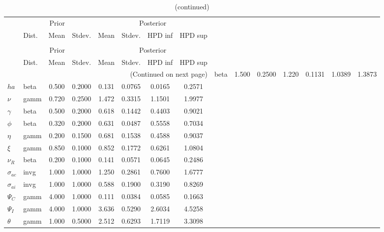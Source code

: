  
\begin{center}
\begin{longtable}{llcccccc} 
\caption{Results from Metropolis-Hastings (parameters)}
 \label{Table:MHPosterior:1}\\
\toprule 
  & \multicolumn{3}{c}{Prior}  &  \multicolumn{4}{c}{Posterior} \\
  \cmidrule(r{.75em}){2-4} \cmidrule(r{.75em}){5-8}
  & Dist. & Mean  & Stdev. & Mean & Stdev. & HPD inf & HPD sup\\
\midrule \endfirsthead 
\caption{(continued)}\\\toprule 
  & \multicolumn{3}{c}{Prior}  &  \multicolumn{4}{c}{Posterior} \\
  \cmidrule(r{.75em}){2-4} \cmidrule(r{.75em}){5-8}
  & Dist. & Mean  & Stdev. & Mean & Stdev. & HPD inf & HPD sup\\
\midrule \endhead 
\bottomrule \multicolumn{8}{r}{(Continued on next page)} \endfoot 
\bottomrule \endlastfoot 
${\sigma}$ & beta &   1.500 & 0.2500 &   1.220& 0.1131 &  1.0389 &  1.3873 \\ 
${ha}$ & beta &   0.500 & 0.2000 &   0.131& 0.0765 &  0.0165 &  0.2571 \\ 
$\nu$ & gamm &   0.720 & 0.2500 &   1.472& 0.3315 &  1.1501 &  1.9977 \\ 
$\gamma$ & beta &   0.500 & 0.2000 &   0.618& 0.1442 &  0.4403 &  0.9021 \\ 
${\phi}$ & beta &   0.320 & 0.2000 &   0.631& 0.0487 &  0.5558 &  0.7034 \\ 
${\eta}$ & gamm &   0.200 & 0.1500 &   0.681& 0.1538 &  0.4588 &  0.9037 \\ 
$\xi$ & gamm &   0.850 & 0.1000 &   0.852& 0.1772 &  0.6261 &  1.0804 \\ 
${\nu_R}$ & beta &   0.200 & 0.1000 &   0.141& 0.0571 &  0.0645 &  0.2486 \\ 
${\sigma_{ac}}$ & invg &   1.000 & 1.0000 &   1.250& 0.2861 &  0.7600 &  1.6777 \\ 
${\sigma_{ai}}$ & invg &   1.000 & 1.0000 &   0.588& 0.1900 &  0.3190 &  0.8269 \\ 
${\Psi_{C}}$ & gamm &   4.000 & 1.0000 &   0.111& 0.0384 &  0.0585 &  0.1663 \\ 
${\Psi_I}$ & gamm &   4.000 & 1.0000 &   3.636& 0.5290 &  2.6034 &  4.5258 \\ 
${\theta}$ & gamm &   1.000 & 0.5000 &   2.512& 0.6293 &  1.7119 &  3.3098 \\ 

\end{longtable}
\end{center}
